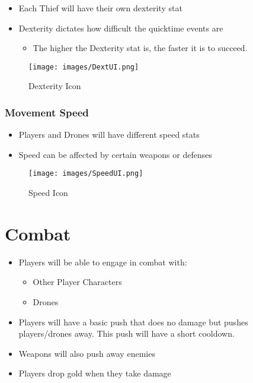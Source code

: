 \documentclass[10pt]{report}
\begin{document}
\begin{minipage}{.85\linewidth}
    \begin{itemize}
        \item Each Thief will have their own dexterity stat
        \item Dexterity dictates how difficult the quicktime events are
        \begin{itemize}
            \item The higher the Dexterity stat is, the faster it is to succeed.    
        \end{itemize}
    \end{itemize}
\end{minipage} \hfill
\begin{minipage}{.13\linewidth}
    \begin{figure}[H]
        \centering
        \texttt{[image: images/DextUI.png]}
        \caption{Dexterity Icon}
    \end{figure}
\end{minipage}

\subsubsection{Movement Speed}

\begin{minipage}{.85\linewidth}
    \begin{itemize}
        \item Players and Drones will have different speed stats
        \item Speed can be affected by certain weapons or defenses
    \end{itemize}
\end{minipage} \hfill
\begin{minipage}{.13\linewidth}
    \begin{figure}[H]
        \centering
        \texttt{[image: images/SpeedUI.png]}
        \caption{Speed Icon}
    \end{figure}
\end{minipage}

\section{Combat}

\begin{itemize}
    \item Players will be able to engage in combat with:
    \begin{itemize}
        \item Other Player Characters
        \item Drones
    \end{itemize}
    \item Players will have a basic push that does no damage but pushes players/drones away. This push will have a short cooldown.
    \item Weapons will also push away enemies
    \item Players drop gold when they take damage
\end{itemize}
\end{document}
